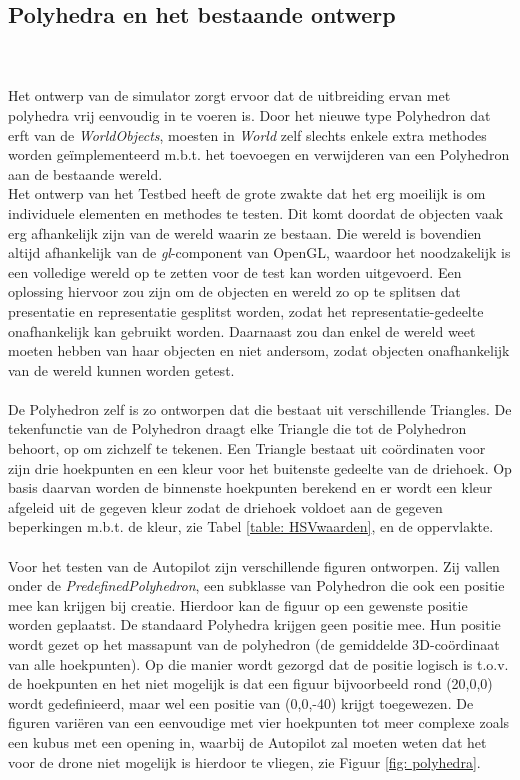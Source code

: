 \subsection{Polyhedra en het bestaande ontwerp}
\\\\
Het ontwerp van de simulator zorgt ervoor dat de uitbreiding ervan met polyhedra vrij eenvoudig in te voeren is. Door het nieuwe type Polyhedron dat erft van de \textit{WorldObjects}, moesten in \textit{World} zelf slechts enkele extra methodes worden ge\"implementeerd m.b.t. het toevoegen en verwijderen van een Polyhedron aan de bestaande wereld.\\
\noindent
Het ontwerp van het Testbed heeft de grote zwakte dat het erg moeilijk is om individuele elementen en methodes te testen. Dit komt doordat de objecten vaak erg afhankelijk zijn van de wereld waarin ze bestaan. Die wereld is bovendien altijd afhankelijk van de \textit{gl}-component van OpenGL, waardoor het noodzakelijk is een volledige wereld op te zetten voor de test kan worden uitgevoerd. Een oplossing hiervoor zou zijn om de objecten en wereld zo op te splitsen dat presentatie en representatie gesplitst worden, zodat het representatie-gedeelte onafhankelijk kan gebruikt worden. Daarnaast zou dan enkel de wereld weet moeten hebben van haar objecten en niet andersom, zodat objecten onafhankelijk van de wereld kunnen worden getest.\\
\\
\noindent 
De Polyhedron zelf is zo ontworpen dat die bestaat uit verschillende Triangles. De tekenfunctie van de Polyhedron draagt elke Triangle die tot de Polyhedron behoort, op om zichzelf te tekenen. Een Triangle bestaat uit co\"ordinaten voor zijn drie hoekpunten en een kleur voor het buitenste gedeelte van de driehoek. Op basis daarvan worden de binnenste hoekpunten berekend en er wordt een kleur afgeleid uit de gegeven kleur zodat de driehoek voldoet aan de gegeven beperkingen m.b.t. de kleur, zie Tabel \ref{table: HSVwaarden}, en de oppervlakte.\\
\\
\noindent
Voor het testen van de Autopilot zijn verschillende figuren ontworpen. Zij vallen onder de \textit{PredefinedPolyhedron}, een subklasse van Polyhedron die ook een positie mee kan krijgen bij creatie. Hierdoor kan de figuur op een gewenste positie worden geplaatst. De standaard Polyhedra krijgen geen positie mee. Hun positie wordt gezet op het massapunt van de polyhedron (de gemiddelde 3D-co\"ordinaat van alle hoekpunten). Op die manier wordt gezorgd dat de positie logisch is t.o.v. de hoekpunten en het niet mogelijk is dat een figuur bijvoorbeeld rond (20,0,0) wordt gedefinieerd, maar wel een positie van (0,0,-40) krijgt toegewezen. De figuren vari\"eren van een eenvoudige met vier hoekpunten tot meer complexe zoals een kubus met een opening in, waarbij de Autopilot zal moeten weten dat het voor de drone niet mogelijk is hierdoor te vliegen, zie Figuur \ref{fig: polyhedra}.

